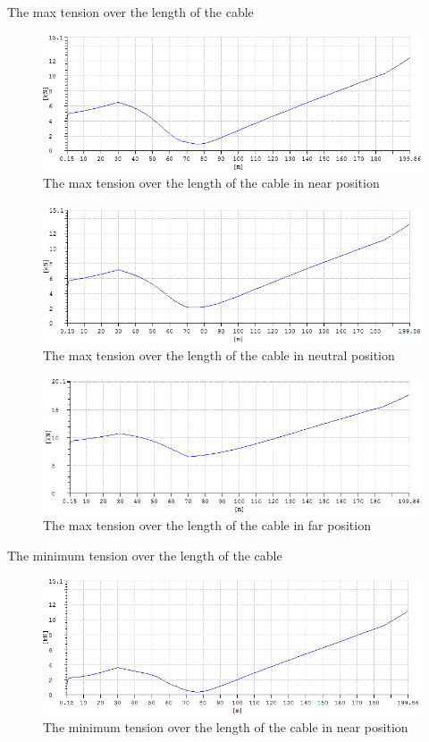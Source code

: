 \noindent The max tension over the length of the cable

\begin{figure}[H]
\centering
\includegraphics[scale=0.5]{figures/fmaxnear}
\caption{The max tension over the length of the cable in near position}
 \label{fig:fmaxnear}
\end{figure}


\begin{figure}[H]
\centering
\includegraphics[scale=0.5]{figures/fmaxneu}
\caption{The max tension over the length of the cable in neutral position}
 \label{fig:fmaxneu}
\end{figure}


\begin{figure}[H]
\centering
\includegraphics[scale=0.5]{figures/fmaxfar}
\caption{The max tension over the length of the cable in far position}
 \label{fig:fmaxfar}
\end{figure}

\noindent The minimum tension over the length of the cable

\begin{figure}[H]
\centering
\includegraphics[scale=0.5]{figures/fminnear}
\caption{The minimum tension over the length of the cable in near position}
 \label{fig:fminnear}
\end{figure}


